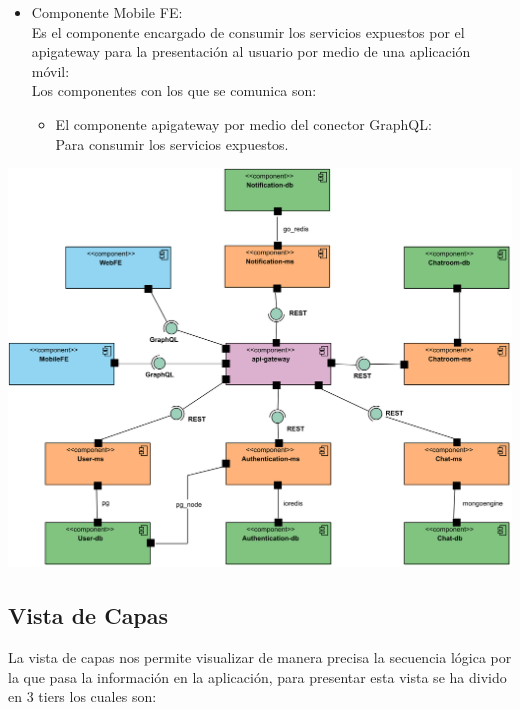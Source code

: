 \begin{itemize}
    Los componentes con los que se comunica son:
    \begin{itemize}
        \item El componente api\textunderscore gateway por medio del conector GraphQL:\\
        Para consumir los servicios expuestos.
    \end{itemize}
    \item Componente Mobile FE:\\
    Es el componente encargado de consumir los servicios expuestos por el api\textunderscore gateway para la presentación al usuario por medio de una aplicación móvil:\\
    Los componentes con los que se comunica son:
    \begin{itemize}
        \item El componente api\textunderscore gateway por medio del conector GraphQL:\\
        Para consumir los servicios expuestos.
    \end{itemize}
\end{itemize}
\begin{center}
    \includegraphics[width=14cm]{Figures/P3/CYC.png}    
\end{center}

\subsection{Vista de Capas}
La vista de capas nos permite visualizar de manera precisa la secuencia lógica por la que pasa la información en la aplicación, para presentar esta vista se ha divido en 3 tiers los cuales son:\\

